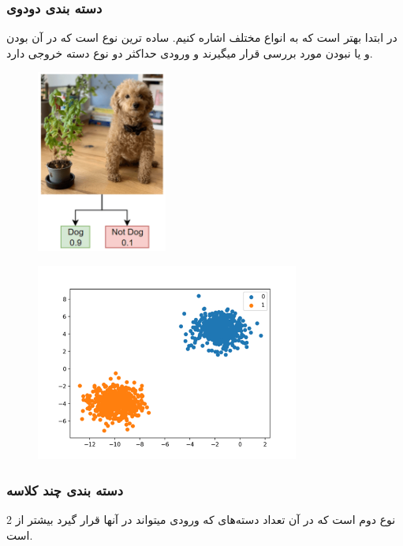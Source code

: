 \documentclass[a4paper, titlepage]{article}
\begin{document}
\subsubsection{دسته‌ بندی دودوی}
در ابتدا بهتر است که به انواع مختلف  اشاره کنیم. ساده ترین نوع  است که در آن بودن و یا نبودن مورد بررسی قرار میگیرند و ورودی حداکثر دو نوع دسته خروجی دارد.
\begin{figure}[H]
    \center
    \begin{minipage}[b]{0.4\textwidth}
        \center
        \includegraphics[width=\textwidth, height=6cm, width=4.5cm]{Classification-img1.png}
        \label{Classification-img1}
    \end{minipage}
    \hfill
    \begin{minipage}[b]{0.5\textwidth}
        \center
        \includegraphics[width=\textwidth, height=6.5cm]{Classification-img2.png}
        \label{Classification-img2}
    \end{minipage}
    \caption{}
\end{figure}

\subsubsection{دسته‌ بندی چند کلاسه}
نوع دوم  است که در آن تعداد دسته‌های که ورودی میتواند در آنها قرار گیرد بیشتر از 2 است.
\end{document}

